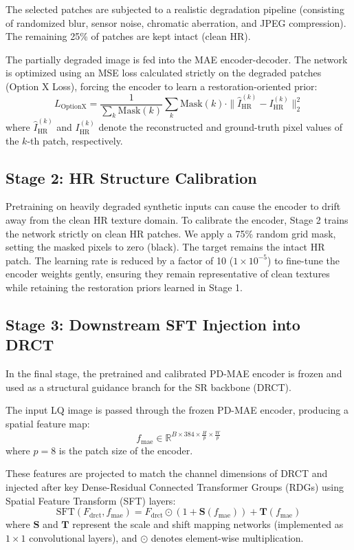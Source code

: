 \documentclass[journal,10pt,doublecolumn]{IEEEtran}
\begin{document}
The selected patches are subjected to a realistic degradation pipeline (consisting of randomized blur, sensor noise, chromatic aberration, and JPEG compression). The remaining 25\% of patches are kept intact (clean HR).

The partially degraded image is fed into the MAE encoder-decoder. The network is optimized using an MSE loss calculated strictly on the degraded patches (Option X Loss), forcing the encoder to learn a restoration-oriented prior:
\begin{equation}
L_{\text{OptionX}} = \frac{1}{\sum_k \text{Mask}(k)} \sum_{k} \text{Mask}(k) \cdot \| \hat{I}_{\text{HR}}^{(k)} - I_{\text{HR}}^{(k)} \|_2^2
\end{equation}
where $\hat{I}_{\text{HR}}^{(k)}$ and $I_{\text{HR}}^{(k)}$ denote the reconstructed and ground-truth pixel values of the $k$-th patch, respectively.

\subsection{Stage 2: HR Structure Calibration}
Pretraining on heavily degraded synthetic inputs can cause the encoder to drift away from the clean HR texture domain. To calibrate the encoder, Stage 2 trains the network strictly on clean HR patches. We apply a 75\% random grid mask, setting the masked pixels to zero (black). The target remains the intact HR patch. The learning rate is reduced by a factor of 10 ($1 \times 10^{-5}$) to fine-tune the encoder weights gently, ensuring they remain representative of clean textures while retaining the restoration priors learned in Stage 1.

\subsection{Stage 3: Downstream SFT Injection into DRCT}
In the final stage, the pretrained and calibrated PD-MAE encoder is frozen and used as a structural guidance branch for the SR backbone (DRCT). 

The input LQ image is passed through the frozen PD-MAE encoder, producing a spatial feature map:
\begin{equation}
f_{\text{mae}} \in \mathbb{R}^{B \times 384 \times \frac{H}{p} \times \frac{W}{p}}
\end{equation}
where $p = 8$ is the patch size of the encoder. 

These features are projected to match the channel dimensions of DRCT and injected after key Dense-Residual Connected Transformer Groups (RDGs) using Spatial Feature Transform (SFT) layers:
\begin{equation}
\text{SFT}(F_{\text{drct}}, f_{\text{mae}}) = F_{\text{drct}} \odot (1 + \mathbf{S}(f_{\text{mae}})) + \mathbf{T}(f_{\text{mae}})
\end{equation}
where $\mathbf{S}$ and $\mathbf{T}$ represent the scale and shift mapping networks (implemented as $1 \times 1$ convolutional layers), and $\odot$ denotes element-wise multiplication.
\end{document}
